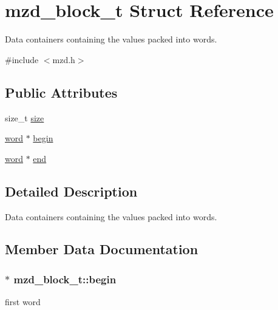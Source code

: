 \hypertarget{structmzd__block__t}{}\section{mzd\+\_\+block\+\_\+t Struct Reference}
\label{structmzd__block__t}


Data containers containing the values packed into words.  




{\ttfamily \#include $<$mzd.\+h$>$}

\subsection*{Public Attributes}
\begin{DoxyCompactItemize}
\item 
size\+\_\+t \hyperlink{structmzd__block__t_a172b39de6b4e23708f9069054a5e5439}{size}
\item 
\hyperlink{misc_8h_a8829cde3436decd2d2c3d99ed7d649f1}{word} $\ast$ \hyperlink{structmzd__block__t_a0b2a4130a16426295b392434f158c36d}{begin}
\item 
\hyperlink{misc_8h_a8829cde3436decd2d2c3d99ed7d649f1}{word} $\ast$ \hyperlink{structmzd__block__t_a28247ab4c8ed616287ec5daaf8878f96}{end}
\end{DoxyCompactItemize}


\subsection{Detailed Description}
Data containers containing the values packed into words. 

\subsection{Member Data Documentation}
\hypertarget{structmzd__block__t_a0b2a4130a16426295b392434f158c36d}{}
\subsubsection[{begin}]{$\ast$ mzd\+\_\+block\+\_\+t\+::begin}\label{structmzd__block__t_a0b2a4130a16426295b392434f158c36d}
first word \hypertarget{structmzd__block__t_a28247ab4c8ed616287ec5daaf8878f96}{}
